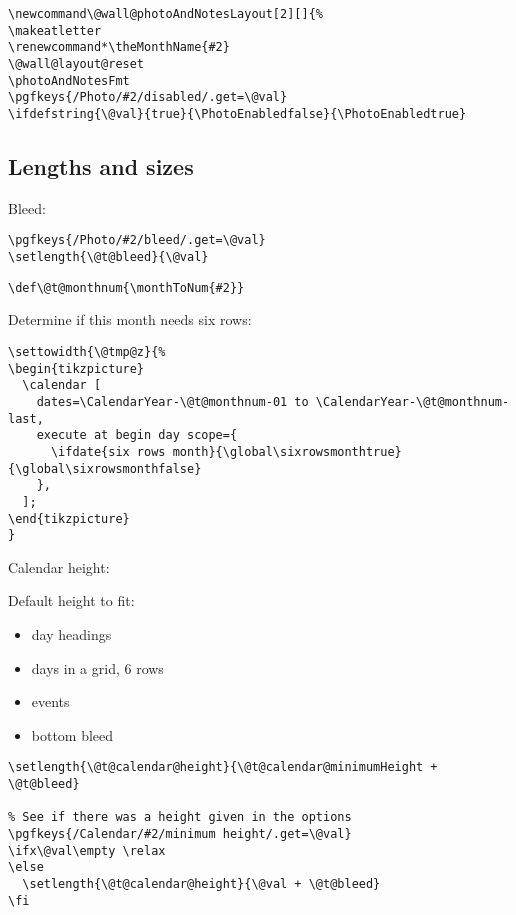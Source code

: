 \documentclass[11pt,oneside]{memoir-article}
\begin{document}
\begin{verbatim}
\newcommand\@wall@photoAndNotesLayout[2][]{%
\makeatletter
\renewcommand*\theMonthName{#2}
\@wall@layout@reset
\photoAndNotesFmt
\pgfkeys{/Photo/#2/disabled/.get=\@val}
\ifdefstring{\@val}{true}{\PhotoEnabledfalse}{\PhotoEnabledtrue}
\end{verbatim}

\subsection{Lengths and sizes}
\label{sec:orgef3d9b4}

Bleed:

\begin{verbatim}
\pgfkeys{/Photo/#2/bleed/.get=\@val}
\setlength{\@t@bleed}{\@val}
\end{verbatim}

\begin{verbatim}
\def\@t@monthnum{\monthToNum{#2}}
\end{verbatim}

Determine if this month needs six rows:

\begin{verbatim}
\settowidth{\@tmp@z}{%
\begin{tikzpicture}
  \calendar [
    dates=\CalendarYear-\@t@monthnum-01 to \CalendarYear-\@t@monthnum-last,
    execute at begin day scope={
      \ifdate{six rows month}{\global\sixrowsmonthtrue}{\global\sixrowsmonthfalse}
    },
  ];
\end{tikzpicture}
}
\end{verbatim}

Calendar height:

Default height to fit:

\begin{itemize}
\item day headings
\item days in a grid, 6 rows
\item events
\item bottom bleed
\end{itemize}

\begin{verbatim}
\setlength{\@t@calendar@height}{\@t@calendar@minimumHeight + \@t@bleed}

% See if there was a height given in the options
\pgfkeys{/Calendar/#2/minimum height/.get=\@val}
\ifx\@val\empty \relax
\else
  \setlength{\@t@calendar@height}{\@val + \@t@bleed}
\fi
\end{verbatim}
\end{document}
